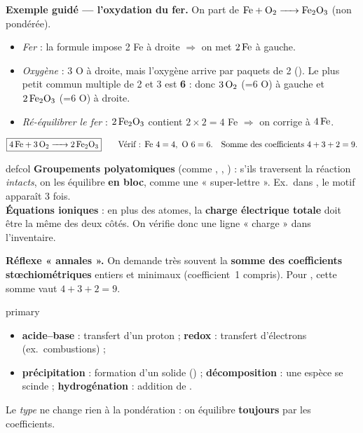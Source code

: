\documentclass[11pt,a4paper]{article}
\begin{document}
\textbf{\color{primarydark}Exemple guidé — l'oxydation du fer.}
On part de $\ce{Fe + O2 -> Fe2O3}$ (non pondérée).

\begin{itemize}[leftmargin=1.4em,topsep=1pt,itemsep=1pt]
  \item \emph{Fer} : la formule  impose 2 Fe à droite $\Rightarrow$ on met $2\,\ce{Fe}$ à gauche.
  \item \emph{Oxygène} : 3 O à droite, mais l'oxygène arrive par paquets de 2 (). Le plus petit
        commun multiple de 2 et 3 est \textbf{6} : donc $3\,\ce{O2}$ (=6 O) à gauche et $2\,\ce{Fe2O3}$ (=6 O) à droite.
  \item \emph{Ré-équilibrer le fer} : $2\,\ce{Fe2O3}$ contient $2\times2=4$ Fe $\Rightarrow$ on corrige à $4\,\ce{Fe}$.
\end{itemize}
\[
\boxed{\ce{4 Fe + 3 O2 -> 2 Fe2O3}}\qquad\text{Vérif : Fe } 4=4,\ \text{O } 6=6.\quad\text{Somme des coefficients } 4+3+2=9.
\]

\begin{tutobox}{defcol}
\textbf{Groupements polyatomiques} (comme , , ) : s'ils traversent la
réaction \emph{intacts}, on les équilibre \textbf{en bloc}, comme une « super-lettre ».
Ex.\ dans , le motif  apparaît 3 fois.\\[2pt]
\textbf{Équations ioniques} : en plus des atomes, la \textbf{charge électrique totale} doit être la
même des deux côtés. On vérifie donc une ligne « charge » dans l'inventaire.
\end{tutobox}

\textbf{\color{primarydark}Réflexe « annales ».} On demande très souvent la \textbf{somme des
coefficients stœchiométriques} entiers et minimaux (coefficient~1 compris). Pour
, cette somme vaut $4+3+2=9$.

\begin{tutobox}{primary}
\begin{itemize}[leftmargin=1.4em,topsep=0pt,itemsep=0pt]
  \item \textbf{acide--base} : transfert d'un proton  ;\quad
        \textbf{redox} : transfert d'électrons (ex.\ combustions) ;
  \item \textbf{précipitation} : formation d'un solide () ;\quad
        \textbf{décomposition} : une espèce se scinde ;\quad
        \textbf{hydrogénation} : addition de .
\end{itemize}
Le \emph{type} ne change rien à la pondération : on équilibre \textbf{toujours} par les coefficients.
\end{tutobox}
\end{document}
